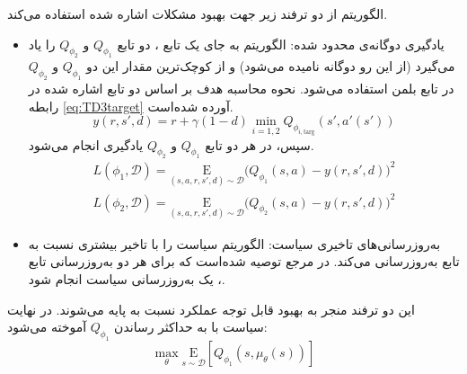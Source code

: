  
 الگوریتم
از دو ترفند زیر جهت بهبود مشکلات اشاره شده‌ استفاده می‌کند.
\begin{itemize}
	\item یادگیری دوگانه‌ی محدود شده:
	 الگوریتم 
	  به جای یک تابع ، دو تابع
	   \(Q_{\phi_1}\) و \(Q_{\phi_2}\)
	    را یاد می‌گیرد (از این رو دوگانه نامیده می‌شود) و از کوچک‌ترین مقدار این دو 
	     \(Q_{\phi_1}\) و \(Q_{\phi_2}\)
	      در تابع بلمن استفاده می‌شود. نحوه محاسبه هدف بر اساس دو تابع 
	       اشاره شده
	       در رابطه
	       \eqref{eq:TD3target}
	       آورده شده‌است.
	      \begin{equation}\label{eq:TD3target}
	      	y(r,s',d) = r + \gamma (1 - d) \min_{i=1,2} Q_{\phi_{i, \text{targ}}}(s', a'(s'))
	      \end{equation}
	      سپس، در هر دو تابع \(Q_{\phi_1}\) و \(Q_{\phi_2}\) یادگیری انجام می‌شود.
	      \begin{align}
	       L(\phi_1, {\mathcal D}) = 
	       	\underset{(s,a,r,s',d) \sim {\mathcal D}}{{\mathrm E}}
	       	{
	       	\Bigg( Q_{\phi_1}(s,a) - y(r,s',d) \Bigg)^2
	       }\\
	       L(\phi_2, {\mathcal D}) = \underset{(s,a,r,s',d) \sim {\mathcal D}}{{\mathrm E}}
	       	 {
	       	\Bigg( Q_{\phi_2}(s,a) - y(r,s',d) \Bigg)^2
	       }
	      \end{align}
	  \item به‌روزرسانی‌های تاخیری سیاست:
	   الگوریتم
	  سیاست را با تاخیر بیشتری نسبت به تابع  به‌روزرسانی می‌کند. در مرجع
	  \cite{TD3}
	   توصیه شده‌است که برای هر دو به‌روزرسانی تابع ، یک به‌روزرسانی سیاست انجام شود.
\end{itemize}
این دو ترفند منجر به بهبود قابل توجه عملکرد
 نسبت به  پایه می‌شوند.
 در نهایت سیاست با به حداکثر رساندن \(Q_{\phi_1} \) آموخته می‌شود:
 \begin{equation}
	 \max_{\theta} \underset{s \sim {\mathcal D}}{{\mathrm E}}\left[ Q_{\phi_1}(s, \mu_{\theta}(s)) \right]
 \end{equation}
 
